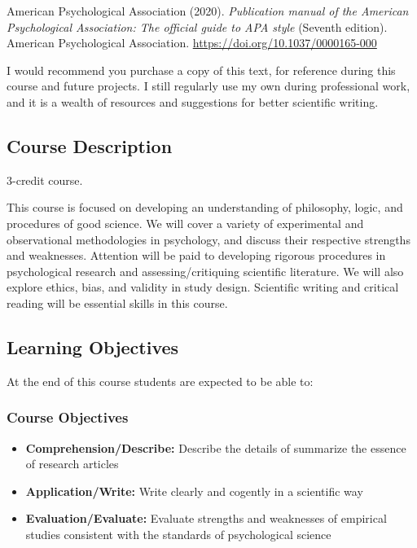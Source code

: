 \documentclass[
  12pt,
  letterpaper,
]{scrartcl}
\providecommand{\tightlist}{%
  \setlength{\itemsep}{0pt}\setlength{\parskip}{0pt}}\usepackage{longtable,booktabs,array}
\begin{document}
American Psychological Association (2020). \emph{Publication manual of
the {American Psychological Association}: The official guide to {APA}
style} (Seventh edition). American Psychological Association.
\url{https://doi.org/10.1037/0000165-000}

I would recommend you purchase a copy of this text, for reference during
this course and future projects. I still regularly use my own during
professional work, and it is a wealth of resources and suggestions for
better scientific writing.

\subsection{Course Description}\label{course-description}

3-credit course.

This course is focused on developing an understanding of philosophy,
logic, and procedures of good science. We will cover a variety of
experimental and observational methodologies in psychology, and discuss
their respective strengths and weaknesses. Attention will be paid to
developing rigorous procedures in psychological research and
assessing/critiquing scientific literature. We will also explore ethics,
bias, and validity in study design. Scientific writing and critical
reading will be essential skills in this course.

\subsection{Learning Objectives}\label{learning-objectives}

At the end of this course students are expected to be able to:

\subsubsection{Course Objectives}\label{course-objectives}

\begin{itemize}
\tightlist
\item
  \textbf{Comprehension/Describe:} Describe the details of summarize the
  essence of research articles
\item
  \textbf{Application/Write:} Write clearly and cogently in a scientific
  way
\item
  \textbf{Evaluation/Evaluate:} Evaluate strengths and weaknesses of
  empirical studies consistent with the standards of psychological
  science
\end{itemize}
\end{document}

